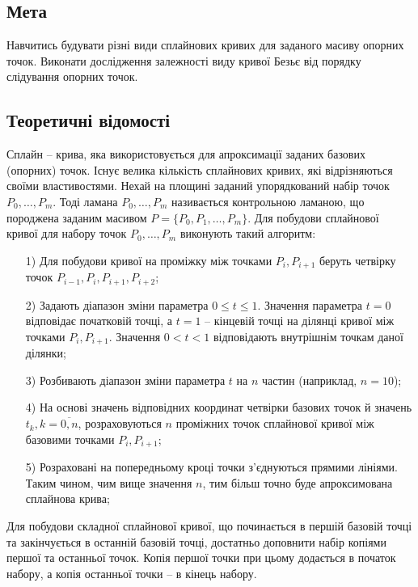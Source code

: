 \documentclass[a4paper,14pt]{extarticle} %
\begin{document}


\newpage

\subsection*{Мета}
Навчитись будувати різні види сплайнових кривих для заданого масиву опорних точок.
Виконати дослідження залежності виду кривої Безьє від порядку слідування опорних точок.

\subsection*{Теоретичні відомості} 
Сплайн -- крива, яка використовується для апроксимації заданих базових (опорних) точок. Існує велика кількість 
сплайнових кривих, які відрізняються своїми властивостями. Нехай на площині заданий упорядкований набір точок 
$P_0, \dots, P_m$. Тоді ламана $P_0, \dots, P_m$ називається контрольною ламаною, що породжена заданим масивом 
$P = \{P_0, P_1,\dots,P_m\}$. Для побудови сплайнової кривої для набору точок $P_0, \dots, P_m$ виконують 
такий алгоритм:
\begin{enumerate}
    \item[1)] Для побудови кривої на проміжку між точками $P_i, P_{i+1}$ беруть четвірку точок $P_{i-1},P_i,P_{i+1},P_{i+2}$;
    \item[2)] Задають діапазон зміни параметра $0 \leqslant t \leqslant 1$. Значення параметра $t=0$ відповідає 
    початковій точці, а $t=1$ -- кінцевій точці на ділянці кривої між точками $P_i, P_{i+1}$. Значення $0<t<1$
    відповідають внутрішнім точкам даної ділянки;
    \item[3)] Розбивають діапазон зміни параметра $t$ на $n$ частин (наприклад, $n=10$);
    \item[4)] На основі значень відповідних координат четвірки базових точок й значень $t_k, k = \overline{0,n}$,
    розраховуються $n$ проміжних точок сплайнової кривої між базовими точками $P_i, P_{i+1}$;
    \item[5)] Розраховані на попередньому кроці точки з'єднуються прямими лініями. Таким чином, чим вище значення $n$, 
    тим більш точно буде апроксимована сплайнова крива;
\end{enumerate}

Для побудови складної сплайнової кривої, що починається в першій базовій точці та закінчується в останній 
базовій точці, достатньо доповнити набір копіями першої та останньої точок. Копія першої точки при цьому 
додається в початок набору, а копія останньої точки -- в кінець набору.
\end{document}
